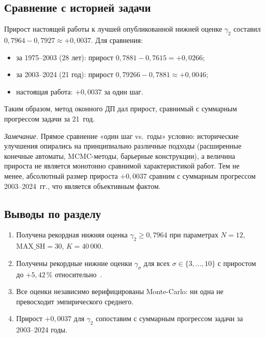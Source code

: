 \subsection{Сравнение с историей задачи}

Прирост настоящей работы к лучшей опубликованной нижней оценке $\gamma_2$ составил $0{,}7964 - 0{,}7927 \approx +0{,}0037$. Для сравнения:
\begin{itemize}
    \item за 1975--2003 (28 лет): прирост $0{,}7881 - 0{,}7615 = +0{,}0266$;
    \item за 2003--2024 (21 год): прирост $0{,}79266 - 0{,}7881 \approx +0{,}0046$;
    \item настоящая работа: $+0{,}0037$ за один шаг.
\end{itemize}
Таким образом, метод оконного ДП дал прирост, сравнимый с суммарным прогрессом задачи за 21~год.

\emph{Замечание.} Прямое сравнение «один шаг vs.~годы» условно: исторические улучшения опирались на принципиально различные подходы (расширенные конечные автоматы, MCMC-методы, барьерные конструкции), а величина прироста не является монотонно сравнимой характеристикой работ. Тем не менее, абсолютный размер прироста $+0{,}0037$ сравним с суммарным прогрессом 2003--2024~гг., что является объективным фактом.

\subsection*{Выводы по разделу}

\begin{enumerate}
    \item Получена рекордная нижняя оценка $\gamma_2 \geq 0{,}7964$ при параметрах $N = 12$, $\mathrm{MAX\_SH} = 30$, $K = 40\,000$.
    \item Получены рекордные нижние оценки $\gamma_\sigma$ для всех $\sigma \in \{3, \ldots, 10\}$ с приростом до $+5{,}42\,\%$ относительно~\cite{heineman2024}.
    \item Все оценки независимо верифицированы Monte-Carlo: ни одна не превосходит эмпирического среднего.
    \item Прирост $+0{,}0037$ для $\gamma_2$ сопоставим с суммарным прогрессом задачи за 2003--2024 годы.
\end{enumerate}
